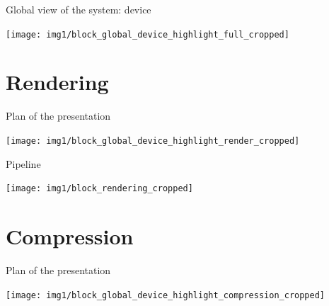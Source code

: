 \documentclass[10pt]{beamer}
\begin{document}

\begin{frame}{Global view of the system: device}
    \begin{center}
        \texttt{[image: img1/block\_global\_device\_highlight\_full\_cropped]}
    \end{center}
\end{frame}

\section{Rendering}
\begin{frame}{Plan of the presentation}
    \begin{center}
        \texttt{[image: img1/block\_global\_device\_highlight\_render\_cropped]}
    \end{center}
\end{frame}

\begin{frame}{Pipeline}
    \begin{center}
        \texttt{[image: img1/block\_rendering\_cropped]}
    \end{center}
\end{frame}

\section{Compression}
\begin{frame}{Plan of the presentation}
    \begin{center}
        \texttt{[image: img1/block\_global\_device\_highlight\_compression\_cropped]}
    \end{center}
\end{frame}
\end{document}
